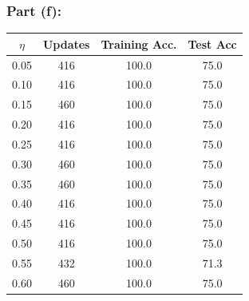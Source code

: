 \documentclass[11pt]{article}
\begin{document}
\begin{flushleft}
\subsubsection*{Part (f):}
\begin{center}
	\begin{tabular}{||c c c c||} 
		\hline
		$\eta$ & Updates & Training Acc. & Test Acc \\ [0.5ex] 
		\hline\hline
		0.05 & 416 & 100.0 & 75.0 \\
		\hline
		0.10 & 416 & 100.0 & 75.0 \\
		\hline
		0.15 & 460 & 100.0 & 75.0 \\
		\hline
		0.20 & 416 & 100.0 & 75.0 \\
		\hline
		0.25 & 416 & 100.0 & 75.0 \\
		\hline
		0.30 & 460 & 100.0 & 75.0 \\
		\hline
		0.35 & 460 & 100.0 & 75.0 \\
		\hline
		0.40 & 416 & 100.0 & 75.0 \\
		\hline
		0.45 & 416 & 100.0 & 75.0 \\
		\hline
		0.50 & 416 & 100.0 & 75.0 \\
		\hline
		0.55 & 432 & 100.0 & 71.3 \\
		\hline
		0.60 & 460 & 100.0 & 75.0 \\
		\hline
	\end{tabular}
\end{center}

\begin{figure}[H]
	\centering
\end{figure}



\end{flushleft}
\end{document}
